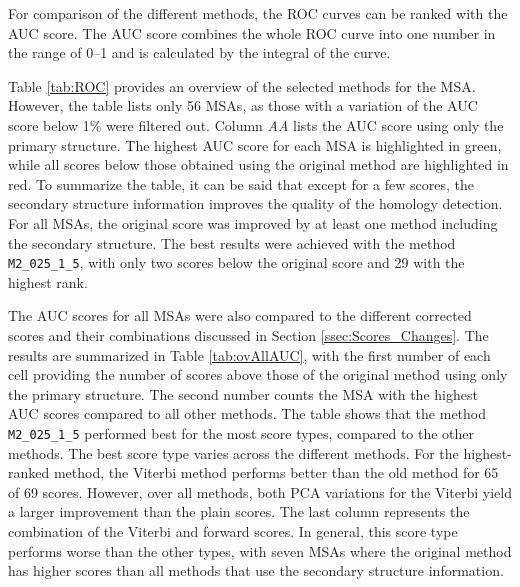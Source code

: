 For comparison of the different methods, the \ac{ROC} curves can be ranked with the \ac{AUC} score. The \ac{AUC} score combines the whole \ac{ROC} curve into one number in the range of 0--1 and is calculated by the integral of the curve. 

Table \ref{tab:ROC} provides an overview of the selected methods for the \ac{MSA}. However, the table lists only 56 \acp{MSA}, as those with  a variation of the AUC score below 1\% were filtered out. Column \textit{AA} lists the \ac{AUC} score using only the primary structure. The highest \ac{AUC} score for each \ac{MSA} is highlighted in green, while all scores below those obtained using the original method  are highlighted in red. To summarize the table, it can be said that except for a few scores, the secondary structure information improves the quality of the homology detection. For all \acp{MSA}, the original score was improved by at least one method including the secondary structure. The best results were achieved with the method \texttt{M2\_025\_1\_5}, with only two scores below the original score and 29 with the highest rank. 


The \ac{AUC} scores for all \acp{MSA} were also compared to the different corrected scores and their combinations discussed in Section \ref{ssec:Scores_Changes}. 
The results are summarized in Table \ref{tab:ovAllAUC}, with the first number of each cell providing the number of scores above those of the original method using only the primary structure. The second number counts the \acs{MSA} with the highest \ac{AUC} scores compared to all other methods. The table shows that the method \texttt{M2\_025\_1\_5} performed best for the most score types, compared to the other methods. The best score type varies across the different methods. For the highest-ranked method, the Viterbi method performs better than the old method for 65 of 69 scores.  However, over all methods, both \ac{PCA} variations for the Viterbi yield a larger improvement than the plain scores. The last column represents the combination of the Viterbi and forward scores. 
In general, this score type performs worse than the other types, with seven \acp{MSA} where the original method has higher scores than all methods that use the secondary structure information.


